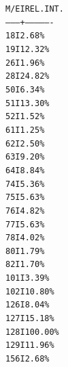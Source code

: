 \documentclass[a4paper,11pt]{article}
\begin{document}
\begin{alltt}
             M/E   I   REL. INT.
           --------+----------------
              18   I      2.68 \%
              19   I     12.32 \%
              26   I      1.96 \%
              28   I     24.82 \%
              50   I      6.34 \%
              51   I     13.30 \%
              52   I      1.52 \%
              61   I      1.25 \%
              62   I      2.50 \%
              63   I      9.20 \%
              64   I      8.84 \%
              74   I      5.36 \%
              75   I      5.63 \%
              76   I      4.82 \%
              77   I      5.63 \%
              78   I      4.02 \%
              80   I      1.79 \%
              82   I      1.70 \%
             101   I      3.39 \%
             102   I     10.80 \%
             126   I      8.04 \%
             127   I     15.18 \%
             128   I    100.00 \%
             129   I     11.96 \%
             156   I      2.68 \%

\newpage
{}



\end{alltt}
\end{document}
